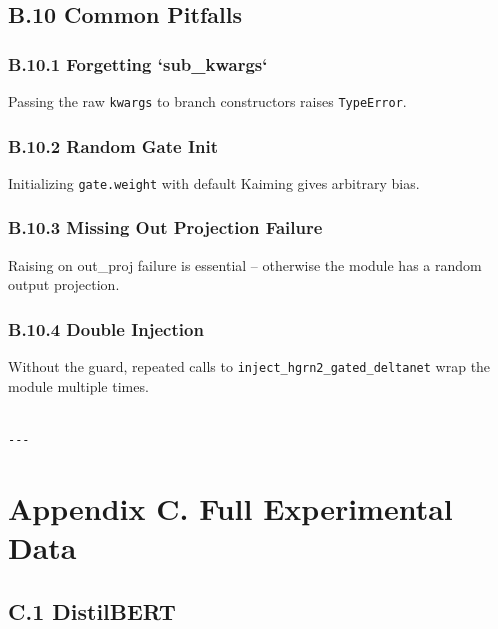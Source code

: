 \subsection{B.10 Common Pitfalls}

\subsubsection{B.10.1 Forgetting `sub\_kwargs`}

Passing the raw \texttt{kwargs} to branch constructors raises \texttt{TypeError}.

\subsubsection{B.10.2 Random Gate Init}

Initializing \texttt{gate.weight} with default Kaiming gives arbitrary bias.

\subsubsection{B.10.3 Missing Out Projection Failure}

Raising on out\_proj failure is essential -- otherwise the module has a 
random output projection.

\subsubsection{B.10.4 Double Injection}

Without the guard, repeated calls to \texttt{inject\_hgrn2\_gated\_deltanet} wrap the 
module multiple times.
\begin{lstlisting}

---
\end{lstlisting}

\section{Appendix C. Full Experimental Data}

\subsection{C.1 DistilBERT}

